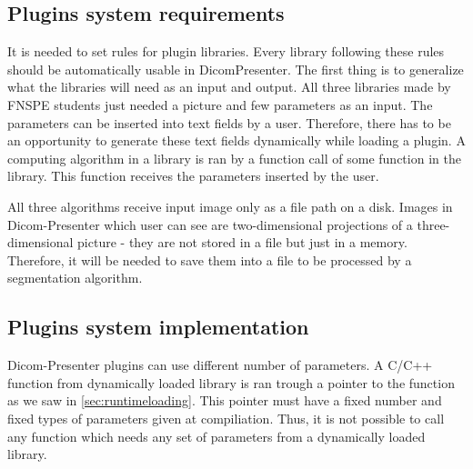 \subsection*{Plugins system requirements}

It is needed to set rules for plugin libraries. Every library following these rules should be automatically usable in DicomPresenter. The first thing is to generalize what the libraries will need as an input and output. All three libraries made by FNSPE students just needed a picture and few parameters as an input. The parameters can be inserted into text fields by a user. Therefore, there has to be an opportunity to generate these text fields dynamically while loading a plugin. A computing algorithm in a library is ran by a function call of some function in the library. This function receives the parameters inserted by the user.

All three algorithms receive input image only as a file path on a disk. Images in Dicom-Presenter which user can see are two-dimensional projections of a three-dimensional picture - they are not stored in a file but just in a memory. Therefore, it will be needed to save them into a file to be processed by a segmentation algorithm.

\subsection*{Plugins system implementation}

Dicom-Presenter plugins can use different number of parameters. A C/C++ function from dynamically loaded library is ran trough a pointer to the function as we saw in \ref{sec:runtimeloading}. This pointer must have a fixed number and fixed types of parameters given at compiliation. Thus, it is not possible to call any function which needs any set of parameters from a dynamically loaded library.
